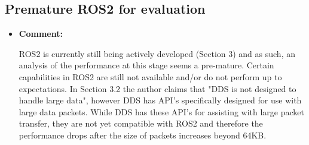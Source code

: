 \documentclass{article}
\begin{document}
\subsection{Premature ROS2 for evaluation}
\begin{itemize}

\item \begin{flushleft}
  \textbf{Comment:}
\end{flushleft}
  ROS2 is currently still being actively developed (Section 3) and as such, an analysis of the performance at this stage seems a pre-mature. Certain capabilities in ROS2 are still not available and/or do not perform up to expectations. In Section 3.2 the author claims that "DDS is not designed to handle large data", however DDS has API's specifically designed for use with large data packets. While DDS has these API’s for assisting with large packet transfer, they are not yet compatible with ROS2 and therefore the performance drops after the size of packets increases beyond 64KB.


\end{itemize}
\end{document}

